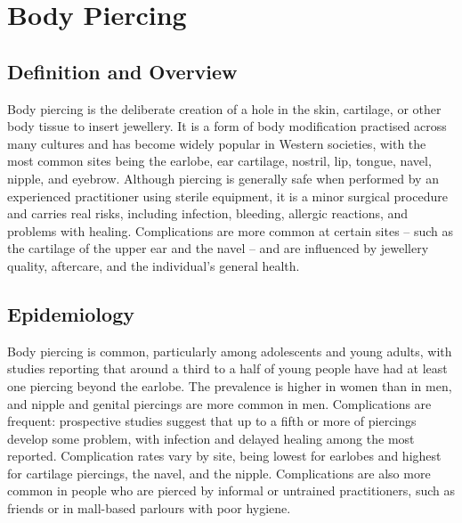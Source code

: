 \chapter{Body Piercing}

\section*{Definition and Overview}
Body piercing is the deliberate creation of a hole in the skin, cartilage, or other body tissue to insert jewellery. It is a form of body modification practised across many cultures and has become widely popular in Western societies, with the most common sites being the earlobe, ear cartilage, nostril, lip, tongue, navel, nipple, and eyebrow. Although piercing is generally safe when performed by an experienced practitioner using sterile equipment, it is a minor surgical procedure and carries real risks, including infection, bleeding, allergic reactions, and problems with healing. Complications are more common at certain sites -- such as the cartilage of the upper ear and the navel -- and are influenced by jewellery quality, aftercare, and the individual's general health.

\section*{Epidemiology}
Body piercing is common, particularly among adolescents and young adults, with studies reporting that around a third to a half of young people have had at least one piercing beyond the earlobe. The prevalence is higher in women than in men, and nipple and genital piercings are more common in men. Complications are frequent: prospective studies suggest that up to a fifth or more of piercings develop some problem, with infection and delayed healing among the most reported. Complication rates vary by site, being lowest for earlobes and highest for cartilage piercings, the navel, and the nipple. Complications are also more common in people who are pierced by informal or untrained practitioners, such as friends or in mall-based parlours with poor hygiene.

